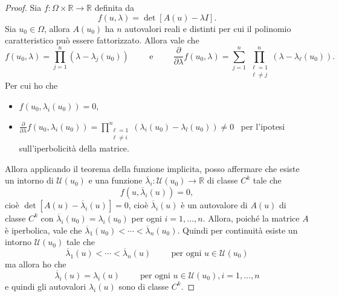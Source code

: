 \begin{proof}
    Sia $f\colon\Omega\times\mathbb{R}\rightarrow\mathbb{R}$ definita da
    \begin{equation*}
        f(u, \lambda)=\det[A(u)-\lambda I].
    \end{equation*}
    Sia $u_{0}\in\Omega$, allora $A(u_{0})$ ha $n$ autovalori reali e distinti per cui il polinomio caratteristico può essere fattorizzato. Allora vale che
    \begin{equation*}
        f(u_{0},\lambda)=\prod_{j=1}^{n}(\lambda-\lambda_{j}(u_{0})) \hspace{1cm}\text{e}\hspace{1cm}\frac{\partial}{\partial\lambda}f(u_{0},\lambda)=\sum_{j=1}^{n}\prod_{\substack{\ell=1\\\ell\neq j}}^{n}(\lambda-\lambda_{\ell}(u_{0})).
    \end{equation*}
    Per cui ho che
    \begin{itemize}
        \item $f(u_{0},\lambda_{i}(u_{0})) = 0$,
        \item $\frac{\partial}{\partial\lambda}f(u_{0},\lambda_{i}(u_{0}))=\prod\limits_{\substack{\ell=1\\\ell\neq i}}^{n}(\lambda_{i}(u_{0})-\lambda_{l}(u_{0}))\neq 0$ \ per l'ipotesi sull'iperbolicità della matrice.
    \end{itemize}
    Allora applicando il teorema della funzione implicita, posso affermare che esiste un intorno di $\mathcal{U}(u_{0})$ e una funzione $\overline{\lambda}_{i}\colon\mathcal{U}(u_{0})\rightarrow\mathbb{R}$ di classe $C^{k}$ tale che 
    \begin{equation*}
    f(u,\overline{\lambda}_{i}(u))=0, 
    \end{equation*}
    cioè $\det[A(u)-\overline{\lambda}_{i}(u)]=0$, cioè $\overline{\lambda}_{i}(u)$ è un autovalore di $A(u)$ di classe $C^{k}$ con $\overline{\lambda}_{i}(u_{0}) = \lambda_{i}(u_{0})$ per ogni $i=1,\ldots, n$.
    Allora, poiché la matrice $A$ è iperbolica, vale che $\overline{\lambda}_{1}(u_{0})<\cdots <\overline{\lambda}_{n}(u_{0})$. Quindi per continuità esiste un intorno $\mathcal{U}(u_{0})$ tale che 
    \begin{equation*}
        \overline{\lambda}_{1}(u)<\cdots <\overline{\lambda}_{n}(u) \hspace{1cm}\text{per ogni } u\in\mathcal{U}(u_{0})
    \end{equation*}
    ma allora ho che
    \begin{equation*}
        \overline{\lambda}_{i}(u)=\lambda_{i}(u) \hspace{1cm}\text{per ogni } u\in\mathcal{U}(u_{0}), i = 1,\ldots, n
    \end{equation*}
    e quindi gli autovalori $\lambda_{i}(u)$ sono di classe $C^{k}$.
\end{proof}
